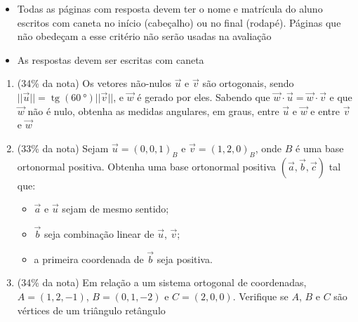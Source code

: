 \documentclass[12pt,a4paper,brazilian, fleqn]{article}
\DeclareMathOperator{\tg}{tg}
\newcommand{\ratio}[1]{(#1\% da nota)}
\renewcommand{\vec}[1]{\overrightarrow{#1}}
\begin{document}
\begin{tcolorbox}[colback=black!10, colframe=black!50, title=Observações]
    \begin{itemize}
        \item Todas as páginas com resposta devem ter o nome e matrícula do aluno
            escritos com caneta no início (cabeçalho) ou no final (rodapé). Páginas
            que não obedeçam a esse critério não serão usadas na avaliação
        \item As respostas devem ser escritas com caneta
    \end{itemize}
\end{tcolorbox}

\begin{enumerate}
    \item \ratio{34} Os vetores não-nulos \(\vec{u}\) e \(\vec{v}\) são ortogonais, sendo \(||\vec{u}||=\tg{(\SI{60}{\degree})} ||\vec{v}||\), e
        \(\vec{w}\) é gerado por eles. Sabendo que \(\vec{w} \cdot \vec{u} = \vec{w} \cdot \vec{v} \) e que \(\vec{w}\)
        não é nulo, obtenha as medidas angulares, em graus, entre \(\vec{u}\) e \(\vec{w}\) e entre \(\vec{v}\) e
        \(\vec{w}\)

    \item \ratio{33} Sejam \(\vec{u}=(0,0,1)_B\) e \(\vec{v}=(1,2,0)_B\), onde \(B\) é uma base ortonormal positiva. Obtenha uma base
        ortonormal positiva \((\vec{a}, \vec{b}, \vec{c})\) tal que:

        \begin{itemize}
            \item \(\vec{a}\) e \(\vec{u}\) sejam de mesmo sentido;
            \item \(\vec{b}\) seja combinação linear de \(\vec{u}\), \(\vec{v}\);
            \item a primeira coordenada de \(\vec{b}\) seja positiva.
        \end{itemize}

    \item \ratio{34} Em relação a um sistema ortogonal de coordenadas, \(A=(1,2,-1)\), \(B=(0,1,-2)\) e \(C=(2,0,0)\).
        Verifique se \(A\), \(B\) e \(C\) são vértices de um triângulo retângulo
\end{enumerate}
\end{document}
